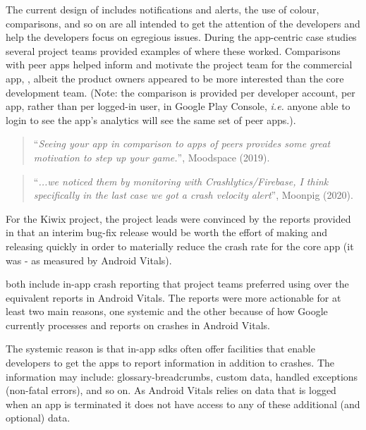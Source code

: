 The current design of  includes notifications and alerts, the use of colour, comparisons, and so on are all intended to get the attention of the developers and help the developers focus on egregious issues. During the app-centric case studies several project teams provided examples of where these worked. Comparisons with peer apps helped inform and motivate the project team for the commercial app, , albeit the product owners appeared to be more interested than the core development team. (Note: the comparison is provided per developer account, per app, rather than per logged-in user, in Google Play Console, \emph{i.e.} anyone able to login to see the app's analytics will see the same set of peer apps.). 

\begin{quote}
    ``\emph{Seeing your app in comparison to apps of peers provides some great motivation to step up your game.}'', Moodspace (2019).
\end{quote}

\begin{quote}
    ``\emph{...we noticed them by monitoring with Crashlytics/Firebase, I think specifically in the last case we got a crash velocity alert}'', Moonpig (2020).
\end{quote}

For the Kiwix project, the project leads were convinced by the reports provided in  that an interim bug-fix release would be worth the effort of making and releasing quickly in order to materially reduce the crash rate for the core app (it was - as measured by Android Vitals).

both include in-app crash reporting that project teams preferred using over the equivalent reports in Android Vitals. The reports were more actionable for at least two main reasons, one systemic and the other because of how Google currently processes and reports on crashes in Android Vitals. 

The systemic reason is that in-app \Gls{sdk}s often offer facilities that enable developers to get the apps to report information in addition to crashes. The information may include: \gls{glossary-breadcrumbs}, custom data, handled exceptions (non-fatal errors), and so on. As Android Vitals relies on data that is logged when an app is terminated it does not have access to any of these additional (and optional) data.

